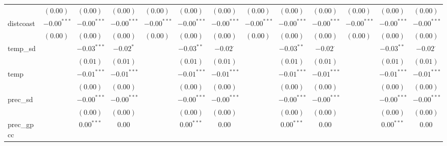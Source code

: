 \begin{sidewaystable}
\begin{center}
{\begin{tabular}{l c c c c c c c c c c c c}
                    & $(0.00)$      & $(0.00)$      & $(0.00)$        & $(0.00)$      & $(0.00)$      & $(0.00)$        & $(0.00)$      & $(0.00)$      & $(0.00)$        & $(0.00)$       & $(0.00)$      & $(0.00)$        \\
distcoast           & $-0.00^{***}$ & $-0.00^{***}$ & $-0.00^{***}$   & $-0.00^{***}$ & $-0.00^{***}$ & $-0.00^{***}$   & $-0.00^{***}$ & $-0.00^{***}$ & $-0.00^{***}$   & $-0.00^{***}$  & $-0.00^{***}$ & $-0.00^{***}$   \\
                    & $(0.00)$      & $(0.00)$      & $(0.00)$        & $(0.00)$      & $(0.00)$      & $(0.00)$        & $(0.00)$      & $(0.00)$      & $(0.00)$        & $(0.00)$       & $(0.00)$      & $(0.00)$        \\
temp\_sd            &               & $-0.03^{***}$ & $-0.02^{*}$     &               & $-0.03^{**}$  & $-0.02^{\cdot}$ &               & $-0.03^{**}$  & $-0.02^{\cdot}$ &                & $-0.03^{**}$  & $-0.02^{\cdot}$ \\
                    &               & $(0.01)$      & $(0.01)$        &               & $(0.01)$      & $(0.01)$        &               & $(0.01)$      & $(0.01)$        &                & $(0.01)$      & $(0.01)$        \\
temp                &               & $-0.01^{***}$ & $-0.01^{***}$   &               & $-0.01^{***}$ & $-0.01^{***}$   &               & $-0.01^{***}$ & $-0.01^{***}$   &                & $-0.01^{***}$ & $-0.01^{***}$   \\
                    &               & $(0.00)$      & $(0.00)$        &               & $(0.00)$      & $(0.00)$        &               & $(0.00)$      & $(0.00)$        &                & $(0.00)$      & $(0.00)$        \\
prec\_sd            &               & $-0.00^{***}$ & $-0.00^{***}$   &               & $-0.00^{***}$ & $-0.00^{***}$   &               & $-0.00^{***}$ & $-0.00^{***}$   &                & $-0.00^{***}$ & $-0.00^{***}$   \\
                    &               & $(0.00)$      & $(0.00)$        &               & $(0.00)$      & $(0.00)$        &               & $(0.00)$      & $(0.00)$        &                & $(0.00)$      & $(0.00)$        \\
prec\_gpcc          &               & $0.00^{***}$  & $0.00$          &               & $0.00^{***}$  & $0.00$          &               & $0.00^{***}$  & $0.00$          &                & $0.00^{***}$  & $0.00$          \\

\end{tabular}}
\end{center}
\end{sidewaystable}
